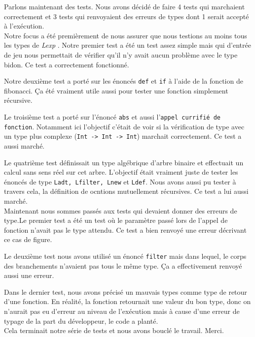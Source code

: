 \documentclass[11pt]{article}
\newcommand{\lexp}{\textit{Lexp} }
\begin{document}
	\vspace{1cm}
	
	
	Parlons maintenant des tests. Nous avons décidé de faire 4 tests qui marchaient correctement et 3 tests qui renvoyaient des erreurs de types dont 1 serait accepté à l'exécution.\\
	
	Notre focus a été premièrement de nous assurer que nous testions au moins tous les types de \lexp. Notre premier test a été un test assez simple mais qui d'entrée de jeu nous permettait de vérifier qu'il n'y avait aucun problème avec le type bidon. Ce test a correctement fonctionné.
	
	Notre deuxième test a porté sur les énoncés \texttt{def} et \texttt{if} à l'aide de la fonction de fibonacci. Ça été vraiment utile aussi pour tester une fonction simplement récursive.
	
	Le troisième test a porté sur l'énoncé \texttt{abs} et aussi l'\texttt{appel currifié de fonction}. Notamment ici l'objectif c'était de voir si la vérification de type avec un type plus complexe (\texttt{Int -> Int -> Int}) marchait correctement. Ce test a aussi marché.
	
	Le quatrième test définissait un type algébrique d'arbre binaire et effectuait un calcul sans sens réel sur cet arbre. L'objectif était vraiment juste de tester les énoncés de type \texttt{Ladt, Lfilter, Lnew} et \texttt{Ldef}. Nous avons aussi pu tester à travers cela, la définition de ocntions mutuellement récursives. Ce test a lui aussi marché.\\
	
	Maintenant nous sommes passés aux tests qui devaient donner des erreurs de type.Le premier test a été un test où le paramètre passé lors de l'appel de fonction n'avait pas le type attendu. Ce test a bien renvoyé une erreur décrivant ce cas de figure.
	
	Le deuxième test nous avons utilisé un énoncé \texttt{filter} mais dans lequel, le corps des branchements n'avaient pas tous le même type. Ça a effectivement renvoyé aussi une erreur.
	
	Dans le dernier test, nous avons précisé un mauvais types comme type de retour d'une fonction. En réalité, la fonction retournait une valeur du bon type, donc on n'aurait pas eu d'erreur au niveau de l'exécution mais à cause d'une erreur de typage de la part du développeur, le code a planté.\\
	
		
	Cela terminait notre série de tests et nous avons bouclé le travail. Merci.
	
	
\end{document}
